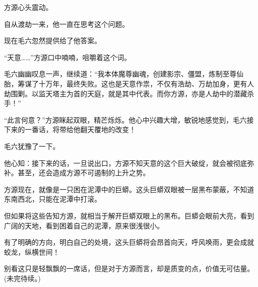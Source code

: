 \begin{this_body}
方源心头震动。

自从渡劫一来，他一直在思考这个问题。

现在毛六忽然提供给了他答案。

“天意……”方源口中喃喃，咀嚼着这个词。

毛六幽幽叹息一声，继续道：“我本体魔尊幽魂，创建影宗、僵盟，炼制至尊仙胎，筹谋了十万年，最终失败。这也是天意作祟，不仅有浩劫、万劫加身，更有人劫围剿。以监天塔主为首的天庭，就是其中代表。而你方源，亦是人劫中的潜藏杀手！”

“此言何意？”方源眯起双眼，精芒烁烁。他心中兴趣大增，敏锐地感觉到，毛六接下来的一番话，将带给他翻天覆地的改变！

毛六犹豫了一下。

他心知：接下来的话，一旦说出口，方源不知天意的这个巨大破绽，就会被彻底弥补。甚至，还会造成方源不可遏制的上升之势。

方源现在，就像是一只困在泥潭中的巨蟒。这头巨蟒双眼被一层黑布蒙蔽，不知道东南西北，只能在泥潭中打滚。

但如果将这些告知方源，就相当于解开巨蟒双眼上的黑布。巨蟒会眼前大亮，看到广阔的天地，看到困着自己的泥潭，原来很浅很小。

有了明确的方向，明白自己的处境，这头巨蟒将会昂首向天，呼风唤雨，更会成就蛟龙，纵横世间！

别看这只是轻飘飘的一席话，但是对于方源而言，却是质变的点，价值无可估量。(未完待续。)

\end{this_body}

